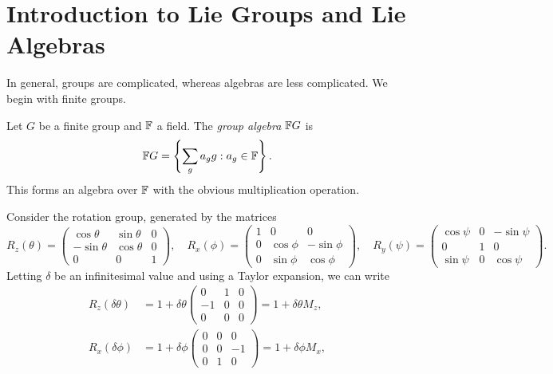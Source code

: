 \section{Introduction to Lie Groups and Lie Algebras}
In general, groups are complicated, whereas
algebras are less complicated. We begin with
finite groups.

\begin{definition}
  Let $G$ be a finite group and $\mathbb{F}$ a field.
  The \emph{group algebra} $\mathbb{F} G$ is
  \[
    \mathbb{F} G = \left\{
      \sum_g a_g g : a_g \in \mathbb{F}
    \right\}.
  \]
  This forms an algebra over $\mathbb{F}$
  with the obvious multiplication operation.
\end{definition}

\begin{example}
  Consider the rotation group, generated by the
  matrices
  \[
    R_z(\theta) =
    \begin{pmatrix}
      \cos \theta & \sin \theta & 0 \\
      -\sin \theta & \cos \theta & 0 \\
      0 & 0 & 1
    \end{pmatrix}, \quad
    R_x(\phi) =
    \begin{pmatrix}
      1 & 0 & 0 \\
      0 & \cos \phi & -\sin \phi \\
      0 & \sin \phi & \cos \phi
    \end{pmatrix}, \quad
    R_y(\psi) =
    \begin{pmatrix}
      \cos \psi & 0 & -\sin \psi \\
      0 & 1 & 0 \\
      \sin \psi & 0 & \cos \psi
    \end{pmatrix}.
  \]
  Letting $\delta$ be an infinitesimal
  value and using
  a Taylor expansion, we can write
  \begin{align*}
    R_z(\delta \theta)
    &= 1 + \delta \theta \begin{pmatrix}
      0 & 1 & 0 \\
      -1 & 0 & 0 \\
      0 & 0 & 0
    \end{pmatrix} = 1 + \delta \theta M_z, \\
    R_x(\delta \phi)
    &= 1 + \delta \phi \begin{pmatrix}
      0 & 0 & 0 \\
      0 & 0 & -1 \\
      0 & 1 & 0
    \end{pmatrix} = 1 + \delta \phi M_x, \\

\end{align*}
\end{example}

